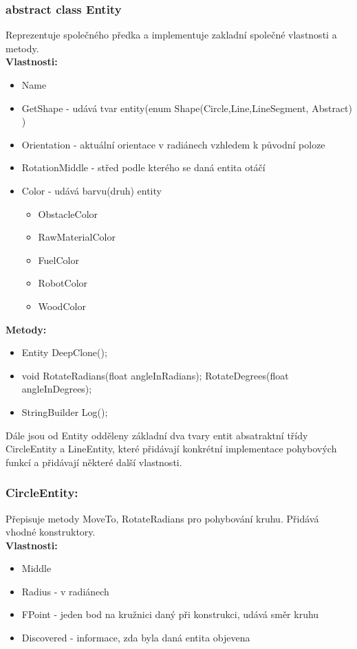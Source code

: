\documentclass[12pt, oneside]{article}
\begin{document}
\subsubsection{abstract class Entity}
Reprezentuje společného předka a implementuje zakladní společné vlastnosti a metody.\\
\textbf{Vlastnosti:} 
\begin{itemize}
\item Name 
\item GetShape - udává tvar entity(enum Shape(Circle,Line,LineSegment, Abstract) ) 
\item Orientation - aktuální orientace v radiánech vzhledem k původní poloze
\item RotationMiddle - střed podle kterého se daná entita otáčí
\item Color - udává barvu(druh) entity
\begin{itemize}
\item ObstacleColor
\item RawMaterialColor
\item FuelColor
\item RobotColor
\item WoodColor 
\end{itemize}
\end{itemize}
\textbf{Metody:}
\begin{itemize}
\item  Entity DeepClone();
\item  void RotateRadians(float angleInRadians);  RotateDegrees(float angleInDegrees); 
\item  StringBuilder Log();
\end{itemize}
	Dále jsou od Entity odděleny základní dva tvary entit absatraktní třídy CircleEntity a LineEntity, které přidávají konkrétní implementace pohybových funkcí a 	přidávají některé další vlastnosti. 

	\subsubsection{CircleEntity:}
	Přepisuje metody MoveTo, RotateRadians pro  pohybování kruhu. Přidává vhodné konstruktory. \\ 
	\textbf{Vlastnosti:} 
	\begin{itemize}
	\item Middle
	\item  Radius - v radiánech
	\item FPoint - jeden bod na kružnici daný při konstrukci, udává směr kruhu
	\item Discovered - informace, zda byla daná entita objevena
	\end{itemize}
\end{document}
